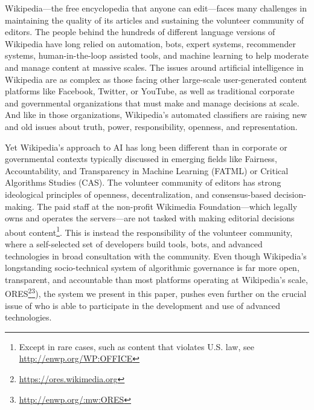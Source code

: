 Wikipedia---the free encyclopedia that anyone can edit---faces many challenges in maintaining the quality of its articles and sustaining the volunteer community of editors. The people behind the hundreds of different language versions of Wikipedia have long relied on automation, bots, expert systems, recommender systems, human-in-the-loop assisted tools, and machine learning to help moderate and manage content at massive scales. The issues around artificial intelligence in Wikipedia are as complex as those facing other large-scale user-generated content platforms like Facebook, Twitter, or YouTube, as well as traditional corporate and governmental organizations that must make and manage decisions at scale. And like in those organizations, Wikipedia's automated classifiers are raising new and old issues about truth, power, responsibility, openness, and representation.

Yet Wikipedia's approach to AI has long been different than in corporate or governmental contexts typically discussed in emerging fields like Fairness, Accountability, and Transparency in Machine Learning (FATML) or Critical Algorithms Studies (CAS). The volunteer community of editors has strong ideological principles of openness, decentralization, and consensus-based decision-making. The paid staff at the non-profit Wikimedia Foundation---which legally owns and operates the servers---are not tasked with making editorial decisions about content\footnote{Except in rare cases, such as content that violates U.S. law, see \url{http://enwp.org/WP:OFFICE}}. This is instead the responsibility of the volunteer community, where a self-selected set of developers build tools, bots, and advanced technologies in broad consultation with the community. Even though Wikipedia's longstanding socio-technical system of algorithmic governance is far more open, transparent, and accountable than most platforms operating at Wikipedia's scale, ORES\footnote{\url{https://ores.wikimedia.org}}\footnote{\url{http://enwp.org/:mw:ORES}}), the system we present in this paper, pushes even further on the crucial issue of who is able to participate in the development and use of advanced technologies.

